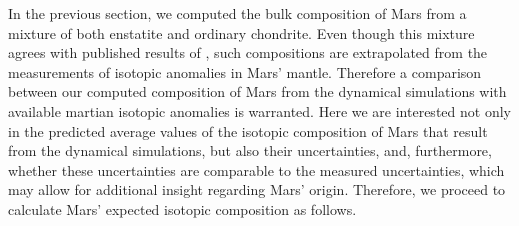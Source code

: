 \documentclass{aa}
\begin{document}
In the previous section, we computed the bulk composition of Mars from a mixture of both enstatite and ordinary chondrite. Even though this mixture agrees with published results of \cite{brasser2018GRL}, such compositions are extrapolated from the measurements of isotopic anomalies in Mars' mantle. Therefore a comparison between our computed composition of Mars from the dynamical simulations with available martian isotopic anomalies is warranted. Here we are interested not only in the predicted average values of the isotopic composition of Mars that result from the dynamical simulations, but also their uncertainties, and, furthermore, whether these uncertainties are comparable to the measured uncertainties, which may allow for additional insight regarding Mars' origin. Therefore, we proceed to calculate Mars' expected isotopic composition as follows. 
\end{document}
